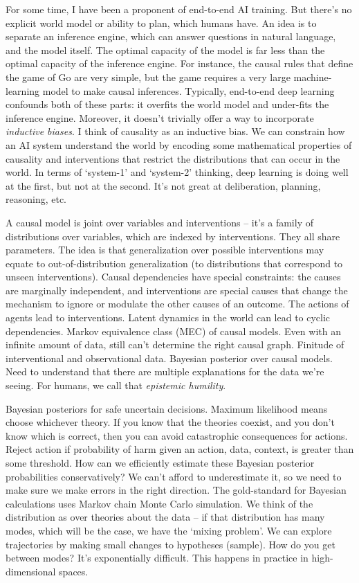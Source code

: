 For some time, I have been a proponent of end-to-end AI training.
But there's no explicit world model or ability to plan, which humans have.
An idea is to separate an inference engine, which can answer questions in natural
language, and the model itself.
The optimal capacity of the model is far less than the optimal capacity of the
inference engine.
For instance, the causal rules that define the game of Go are very simple, but the game
requires a very large machine-learning model to make causal inferences.
Typically, end-to-end deep learning confounds both of these parts: it overfits the
world model and under-fits the inference engine.
Moreover, it doesn't trivially offer a way to incorporate \emph{inductive biases}.
I think of causality as an inductive bias.
We can constrain how an AI system understand the world by encoding some mathematical
properties of causality and interventions that restrict the distributions that can
occur in the world.
In terms of `system-1' and `system-2' thinking, deep learning is doing well at the
first, but not at the second.
It's not great at deliberation, planning, reasoning, etc.

A causal
model is joint over variables and interventions -- it's a family of distributions over
variables, which are indexed by interventions.
They all share parameters.
The idea is that generalization over possible interventions may equate to
out-of-distribution generalization (to distributions that correspond to unseen
interventions).
Causal dependencies have special constraints: the causes are marginally independent,
and interventions are special causes that change the mechanism to ignore or modulate
the other causes of an outcome.
The actions of agents lead to interventions.
Latent dynamics in the world can lead to cyclic dependencies.
Markov equivalence class (MEC) of causal models.
Even with an infinite amount of data, still can't determine the right causal graph.
Finitude of interventional and observational data.
Bayesian posterior over causal models.
Need to understand that there are multiple explanations for the data we're seeing.
For humans, we call that \emph{epistemic humility}.

Bayesian posteriors for safe uncertain decisions.
Maximum likelihood means choose whichever theory.
If you know that the theories coexist, and you don't know which is correct, then you
can avoid catastrophic consequences for actions.
Reject action if probability of harm given an action, data, context, is greater than
some threshold.
How can we efficiently estimate these Bayesian posterior probabilities conservatively?
We can't afford to underestimate it, so we need to make sure we make errors in the
right direction.
The gold-standard for Bayesian calculations uses Markov chain Monte Carlo simulation.
We think of the distribution as over theories about the data -- if that distribution
has many modes, which will be the case, we have the `mixing problem'.
We can explore trajectories by making small changes to hypotheses (sample).
How do you get between modes?
It's exponentially difficult.
This happens in practice in high-dimensional spaces.

